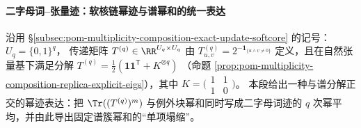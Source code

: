\paragraph{二字母词--张量迹：软核链幂迹与谱幂和的统一表达}
沿用 \S\ref{subsec:pom-multiplicity-composition-exact-update-softcore} 的记号：\(U_q=\{0,1\}^q\)，
传递矩阵 \(T^{(q)}\in\RR^{U_q\times U_q}\) 由
\(
T^{(q)}_{u,v}=2^{-\mathbf{1}_{\{u\wedge v\neq 0\}}}
\)
定义，且在自然张量基下满足分解
\(
T^{(q)}=\tfrac12(\mathbf{1}\mathbf{1}^{\mathsf T}+K^{\otimes q})
\)
（命题 \ref{prop:pom-multiplicity-composition-replica-explicit-eigs}），其中
\(
K=\bigl(\begin{smallmatrix}1&1\\[2pt]1&0\end{smallmatrix}\bigr)
\)。
本段给出一种与谱分解正交的幂迹表达：把 \(\Tr((T^{(q)})^m)\) 与例外块幂和同时写成二字母词迹的 \(q\) 次幂平均，并由此导出固定谱簇幂和的“单项塌缩”。

